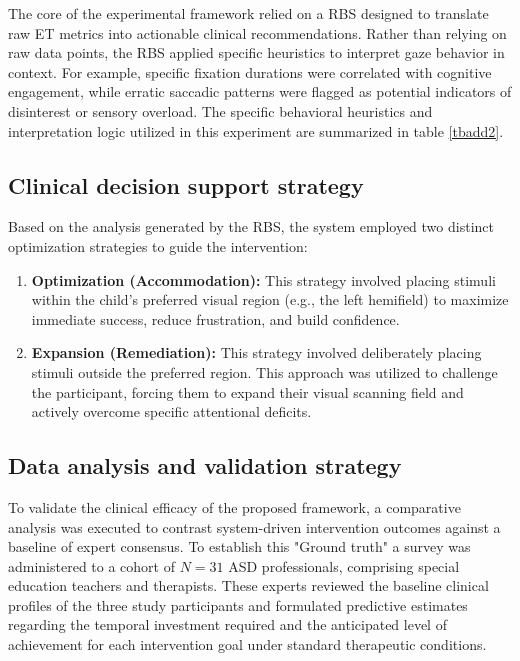 The core of the experimental framework relied on a RBS designed to translate raw ET metrics into actionable clinical recommendations. Rather than relying on raw data points, the RBS applied specific heuristics to interpret gaze behavior in context. For example, specific fixation durations were correlated with cognitive engagement, while erratic saccadic patterns were flagged as potential indicators of disinterest or sensory overload. The specific behavioral heuristics and interpretation logic utilized in this experiment are summarized in table \ref{tbadd2}.



\subsection{Clinical decision support strategy}
Based on the analysis generated by the RBS, the system employed two distinct optimization strategies to guide the intervention:
\begin{enumerate}
    \item \textbf{Optimization (Accommodation):} This strategy involved placing stimuli within the child's preferred visual region (e.g., the left hemifield) to maximize immediate success, reduce frustration, and build confidence.
    \item \textbf{Expansion (Remediation):} This strategy involved deliberately placing stimuli outside the preferred region. This approach was utilized to challenge the participant, forcing them to expand their visual scanning field and actively overcome specific attentional deficits.
\end{enumerate}

\subsection{Data analysis and validation strategy}
To validate the clinical efficacy of the proposed framework, a comparative analysis was executed to contrast system-driven intervention outcomes against a baseline of expert consensus. To establish this "Ground truth" a survey was administered to a cohort of $N=31$ ASD professionals, comprising special education teachers and therapists. These experts reviewed the baseline clinical profiles of the three study participants and formulated predictive estimates regarding the temporal investment required and the anticipated level of achievement for each intervention goal under standard therapeutic conditions.


